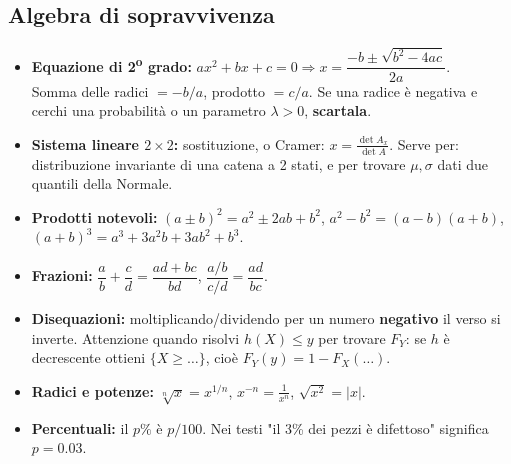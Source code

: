 \documentclass[12pt]{extarticle} %
\begin{document}
\subsection{Algebra di sopravvivenza}
\begin{itemize}
    \item \textbf{Equazione di 2\textsuperscript{o} grado:} $ax^2+bx+c=0 \Rightarrow x = \dfrac{-b \pm \sqrt{b^2-4ac}}{2a}$. \\ {\footnotesize Somma delle radici $=-b/a$, prodotto $=c/a$. Se una radice è negativa e cerchi una probabilità o un parametro $\lambda>0$, \textbf{scartala}.}
    \item \textbf{Sistema lineare $2\times 2$:} sostituzione, o Cramer: $x = \frac{\det A_x}{\det A}$. {\footnotesize Serve per: distribuzione invariante di una catena a 2 stati, e per trovare $\mu,\sigma$ dati due quantili della Normale.}
    \item \textbf{Prodotti notevoli:} $(a\pm b)^2 = a^2 \pm 2ab + b^2$, \quad $a^2-b^2=(a-b)(a+b)$, \quad $(a+b)^3 = a^3+3a^2b+3ab^2+b^3$.
    \item \textbf{Frazioni:} $\dfrac{a}{b}+\dfrac{c}{d} = \dfrac{ad+bc}{bd}$, \quad $\dfrac{a/b}{c/d} = \dfrac{ad}{bc}$.
    \item \textbf{Disequazioni:} moltiplicando/dividendo per un numero \textbf{negativo} il verso si inverte. {\footnotesize Attenzione quando risolvi $h(X)\le y$ per trovare $F_Y$: se $h$ è decrescente ottieni $\{X \ge \dots\}$, cioè $F_Y(y) = 1 - F_X(\dots)$.}
    \item \textbf{Radici e potenze:} $\sqrt[n]{x} = x^{1/n}$, \quad $x^{-n} = \frac{1}{x^n}$, \quad $\sqrt{x^2} = |x|$.
    \item \textbf{Percentuali:} il $p\%$ è $p/100$. {\footnotesize Nei testi "il 3\% dei pezzi è difettoso" significa $p = 0.03$.}
\end{itemize}
\end{document}
